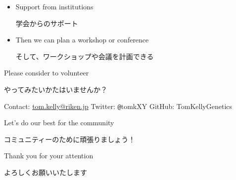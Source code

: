 \documentclass{beamer}
\begin{document}
\begin{frame}
\begin{itemize}
   \item Support from institutions \\ \begin{CJK}{UTF8}{min}学会からのサポート \end{CJK}
      \smallskip
   
   \item Then we can plan a workshop or conference \\ \begin{CJK}{UTF8}{min}そして、ワークショップや会議を計画できる \end{CJK}
   
   \end{itemize}
  
  \end{frame}
  \begin{frame}
   
\vskip1cm   
   
   \begin{center}
   
   \large{Please consider to volunteer}\\
   \Large{\begin{CJK}{UTF8}{min}やってみたいかたはいませんか？\end{CJK}}
   
   Contact: \url{tom.kelly@riken.jp} Twitter: \texttt{@}tomkXY GitHub: TomKellyGenetics
   
   \bigskip   
   
   \large{Let's do our best for the community}\\
   \Large{\begin{CJK}{UTF8}{min}コミュニティーのために頑張りましょう！\end{CJK}}
   
      \large{Thank you for your attention}\\
   \Large{\begin{CJK}{UTF8}{min}よろしくお願いいたします\end{CJK}}
   
   
   \begin{center}
  \end{center}
   \end{center}
   
     \vskip-4cm
\begin{columns}[T] %
  \begin{column}[T]{7.5cm} %
       \end{column} \begin{column}[T]{4cm} %
      
\begin{center}
  \end{center}
       \end{column}
     \end{columns}  

  \end{frame}
    
 
\end{document}
